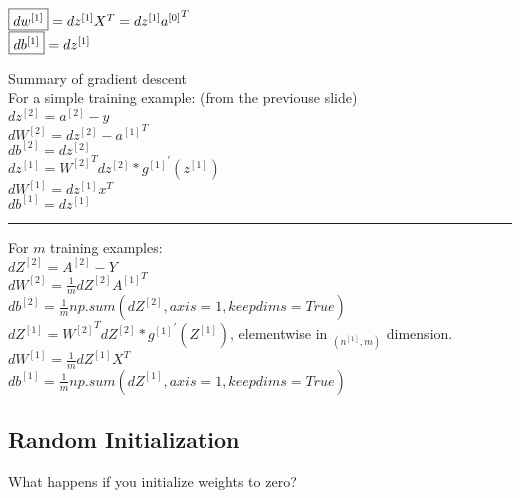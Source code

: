 \documentclass{article}
\begin{document}
$\fbox{$dw^{[1]}$} = dz^{[1]} {X}^T = dz^{[1]} {a^{[0]}}^T$\\

$\fbox{$db^{[1]}$} = dz^{[1]}$\\


\newpage

Summary of gradient descent\\

For a simple training example: (from the previouse slide)\\

$dz^{[2]} = a^{[2]} - y$\\

$dW^{[2]} = dz^{[2]} - {a^{[1]}}^T$\\

$db^{[2]} = dz^{[2]}$\\

$dz^{[1]} = {W^{[2]}}^T dz^{[2]} * {{g^{[1]}}}^{'}(z^{[1]})$\\

$dW^{[1]} = dz^{[1]}x^T$\\

$db^{[1]} = dz^{[1]}$\\

\noindent\rule{8cm}{0.4pt}

For $m$ training examples: \\

$dZ^{[2]} = A^{[2]} - Y$\\

$dW^{[2]} = \frac{1}{m}dZ^{[2]}{A^{[1]}}^T$\\

$db^{[2]} = \frac{1}{m}np.sum(dZ^{[2]}, axis=1, keepdims=True)$\\

$dZ^{[1]} = {W^{[2]}}^T dZ^{[2]} * {{g^{[1]}}}^{'}(Z^{[1]})$, elementwise in $_{(n^{[1]},m)}$ dimension.\\

$dW^{[1]} = \frac{1}{m} dZ^{[1]} X^T$\\

$db^{[1]} = \frac{1}{m}np.sum(dZ^{[1]}, axis=1, keepdims=True)$\\


\newpage
\subsection{Random Initialization}

What happens if you initialize weights to zero?\\
\end{document}
